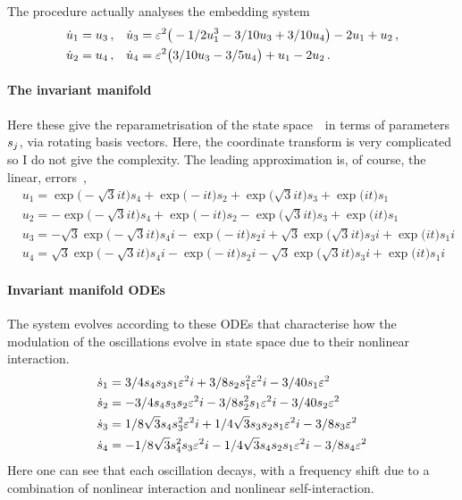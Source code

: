 The procedure actually analyses the embedding system
\begin{align*}&
\dot u_{1}=u\sb3\,,
&&
\dot u_{3}=\varepsilon^{2} \big(-1/2 u\sb1^{3}-3/10 u\sb3+3/10 u\sb4\big)-2 
u\sb1+u\sb2\,,
\\&
\dot u_{2}=u\sb4\,,
&&
\dot u_{4}=\varepsilon^{2} \big(3/10 u\sb3-3/5 u\sb4\big)+u\sb1-2 u\sb2\,.
\end{align*}



\paragraph{The invariant manifold} 
Here these give the reparametrisation of the state space~\uv\ in
terms of parameters~\(s\sb j\), via rotating basis vectors.
Here, the coordinate transform is very complicated so I do not give the complexity.  The leading approximation is, of course, the linear, errors~,
\begin{align*}&
u_{1}=\exp \big(-\sqrt {3} i t\big) s_{4}+\exp \big(-i t\big) s_{2}+\exp
 \big(\sqrt {3} i t\big) s_{3}+\exp \big(i t\big) s_{1}
\\&
u_{2}=-\exp \big(-\sqrt {3} i t\big) s_{4}+\exp \big(-i t\big) s_{2}-
\exp \big(\sqrt {3} i t\big) s_{3}+\exp \big(i t\big) s_{1}
\\&
u_{3}=-\sqrt {3} \exp \big(-\sqrt {3} i t\big) s_{4} i-\exp \big(-i t
\big) s_{2} i+\sqrt {3} \exp \big(\sqrt {3} i t\big) s_{3} i+\exp \big(i
 t\big) s_{1} i
\\&
u_{4}=\sqrt {3} \exp \big(-\sqrt {3} i t\big) s_{4} i-\exp \big(-i t
\big) s_{2} i-\sqrt {3} \exp \big(\sqrt {3} i t\big) s_{3} i+\exp \big(i
 t\big) s_{1} i
\end{align*}

 
\paragraph{Invariant manifold ODEs} 
The system evolves according to these ODEs that characterise how the modulation of the oscillations evolve in state space due to their nonlinear interaction.
\begin{align*}&
\dot s_{1}=3/4 s_{4} s_{3} s_{1} \varepsilon^{2} i+3/8 s_{2} s_{1}^{2} \varepsilon^{2}
 i-3/40 s_{1} \varepsilon^{2}
\\&
\dot s_{2}=-3/4 s_{4} s_{3} s_{2} \varepsilon^{2} i-3/8 s_{2}^{2} s_{1} \varepsilon^{2
} i-3/40 s_{2} \varepsilon^{2}
\\&
\dot s_{3}=1/8 \sqrt {3} s_{4} s_{3}^{2} \varepsilon^{2} i+1/4 \sqrt {3} s_{3} 
s_{2} s_{1} \varepsilon^{2} i-3/8 s_{3} \varepsilon^{2}
\\&
\dot s_{4}=-1/8 \sqrt {3} s_{4}^{2} s_{3} \varepsilon^{2} i-1/4 \sqrt {3} s_{4}
 s_{2} s_{1} \varepsilon^{2} i-3/8 s_{4} \varepsilon^{2}
\end{align*}
Here one can see that each oscillation decays, with a frequency shift due to a combination of nonlinear interaction and nonlinear self-interaction.


